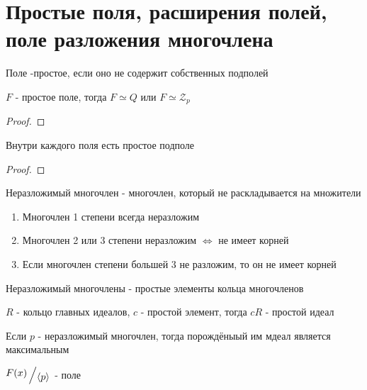 \documentclass[../main/document.tex]{subfiles}
\begin{document}
\section{Простые поля, расширения полей, поле разложения многочлена}
\begin{dfn}
Поле -простое, если оно не содержит собственных подполей
\end{dfn}
\begin{dfn}
\end{dfn}
\begin{thm}
$F$ - простое поле, тогда $F\simeq Q$ или $F\simeq \mathcal{Z}_p$
\begin{proof}

\end{proof}
\end{thm}
\begin{cnsq}
Внутри каждого поля есть простое подполе
\begin{proof}

\end{proof}
\end{cnsq}
\begin{dfn}

\end{dfn}
\begin{dfn}
Неразложимый многочлен - многочлен, который не раскладывается на множители
\end{dfn}
\begin{cnsq}
\begin{enumerate}
\item Многочлен 1 степени всегда неразложим
\item Многочлен 2 или 3 степени неразложим $\Leftrightarrow$ не имеет корней
\item Если многочлен степени большей 3 не разложим, то он не имеет корней
\end{enumerate}
\end{cnsq}
\begin{cnsq}
Неразложимый многочлены - простые элементы кольца многочленов
\end{cnsq}
\begin{thm}
$R$ - кольцо главных идеалов, $c$ - простой элемент, тогда $cR$ - простой идеал
\end{thm}
\begin{cnsq}
Если $p$ - неразложимый многочлен, тогда порождёныый им мдеал является максимальным
\end{cnsq}
\begin{cnsq}
$\bigslant{F(x)}{\langle p\rangle}$ - поле
\end{cnsq}
\end{document}
